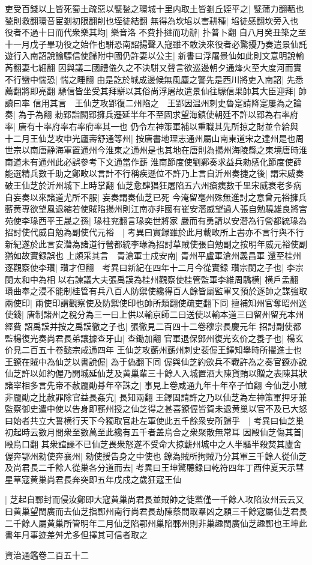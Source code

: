 吏受百錢以上皆死蜀土疏惡以甓甃之環城十里内取土皆剗丘姪平之|{
	甓蒲力翻甎也甃則救翻環音宦剗初限翻削也垤徒結翻}
無得為坎埳以害耕種|{
	埳徒感翻坎旁入也}
役者不過十日而代衆樂其均|{
	樂音洛}
不費扑撻而功辦|{
	扑普卜翻}
自八月癸丑築之至十一月戊子畢功役之始作也駢恐南詔揚聲入寇雖不敢決來役者必驚擾乃奏遣景仙託遊行入南詔說諭驃信使歸附中國仍許妻以公主|{
	新書曰浮屠景仙如此則文意明說輸芮翻妻七細翻}
因與議二國禮儀久之不決駢又聲言欲巡邊朝夕通烽火至大度河而實不行蠻中惴恐|{
	惴之睡翻}
由是訖於城成邊候無風塵之警先是西川將吏入南詔|{
	先悉薦翻將即亮翻}
驃信皆坐受其拜駢以其俗尚浮屠故遣景仙往驃信果帥其大臣迎拜|{
	帥讀曰率}
信用其言　王仙芝攻郢復二州陷之　王郢因温州刺史魯寔請降寔屢為之論奏|{
	為于為翻}
勑郢詣闕郢擁兵遷延半年不至固求望海鎮使朝廷不許以郢為右率府率|{
	唐有十率府率右率府率其一也}
仍令左神策軍補以重職其先所掠之財並令給與　十二月王仙芝攻申光廬壽舒通等州|{
	按唐書地理志通州屬山南東道宋之達州是也周世宗以南唐静海軍置通州今淮東之通州是也其地在唐則為揚州海陵縣之東境唐時淮南道未有通州此必誤參考下文通當作蘄}
淮南節度使劉鄴奏求益兵勑感化節度使薛能選精兵數千助之鄭畋以言計不行稱疾遜位不許乃上言自沂州奏捷之後|{
	謂宋威奏破王仙芝於沂州城下上時掌翻}
仙芝愈肆猖狂屠陷五六州瘡痍數千里宋威衰老多病自妄奏以來諸道尤所不服|{
	妄奏謂奏仙芝已死}
今淹留亳州殊無進討之意曾元裕擁兵蘄黄專欲望風退縮若使賊陷揚州則江南亦非國有崔安濳威望過人張自勉驍雄良將宫苑使李瑑西平王晟之孫|{
	瑑柱兖翻言瑑奕世將家}
嚴而有勇請以安濳為行營都統瑑為招討使代威自勉為副使代元裕　|{
	考異曰實録雖於此月載畋所上書亦不言行與不行新紀遂於此言安濳為諸道行營都統李瑑為招討草賊使張自勉副之按明年威元裕使副猶如故實録誤也}
上頗采其言　青滄軍士戍安南|{
	青州平盧軍滄州義昌軍}
還至桂州逐觀察使李瓚|{
	瓚才但翻　考異曰新紀在四年十二月今從實録}
瓚宗閔之子也|{
	李宗閔太和中為相}
以右諫議大夫張禹謨為桂州觀察使桂管監軍李維周驕横|{
	横戶孟翻}
瓚曲奉之浸不能制桂管有兵八百人防禦使纔得百人餘皆屬監軍又預於逐帥之謀強取兩使印|{
	兩使印謂觀察使及防禦使印也帥所類翻使疏吏翻下同}
擅補知州官奪昭州送使錢|{
	唐制諸州之稅分為三一曰上供以輸京師二曰送使以輸本道三曰留州留充本州經費}
詔禹謨并按之禹謨徹之子也|{
	張徹見二百四十二卷穆宗長慶元年}
招討副使都監楊復光奏尚君長弟讓據查牙山|{
	查鋤加翻}
官軍退保鄧州復光玄价之養子也|{
	楊玄价見二百五十卷懿宗咸通四年}
王仙芝攻蘄州蘄州刺史裴偓王鐸知舉時所擢進士也王鐐在賊中為仙芝以書說偓|{
	為于偽翻下同}
偓與仙芝約歛兵不戰許為之奏官鐐亦說仙芝許以如約偓乃開城延仙芝及黄巢輩三十餘人入城置酒大陳貨賄以贈之表陳其狀諸宰相多言先帝不赦龎勛朞年卒誅之|{
	事見上卷咸通九年十年卒子恤翻}
今仙芝小賊非龎勛之比赦罪除官益長姦宄|{
	長知兩翻}
王鐸固請許之乃以仙芝為左神策軍押牙兼監察御史遣中使以告身即蘄州授之仙芝得之甚喜鐐偓皆賀未退黄巢以官不及已大怒曰始者共立大誓横行天下今獨取官赴左軍使此五千餘衆安所歸乎　|{
	考異曰仙芝巢初起時云數月間衆至數萬至此纔有五千者盖烏合之衆聚散無常耳}
因毆仙芝傷其首|{
	毆烏口翻}
其衆諠譟不已仙芝畏衆怒遂不受命大掠蘄州城中之人半驅半殺焚其廬舍偓奔鄂州勑使奔襄州|{
	勑使授告身之中使也}
鐐為賊所拘賊乃分其軍三千餘人從仙芝及尚君長二千餘人從巢各分道而去|{
	考異曰王坤驚聽録曰乾符四年丁酉仲夏天示彗星草寇黄巢尚君長奔突即五年戊戍之歲狂寇王仙}


|{
	芝起自鄆封而侵汝鄭即大寇黄巢尚君長並賊帥之徒黨僅一千餘人攻陷汝州云云又曰黄巢望閩廣而去仙芝指鄆州南行尚君長劫陳蔡間取羣凶之願三千餘寇屬仙芝君長二千餘人屬黄巢所管明年二月仙芝陷鄂州巢陷鄆州則非巢趣閩廣仙芝趣鄆也王坤此書年月事迹差舛尤多但擇其可信者取之}


資治通鑑卷二百五十二
